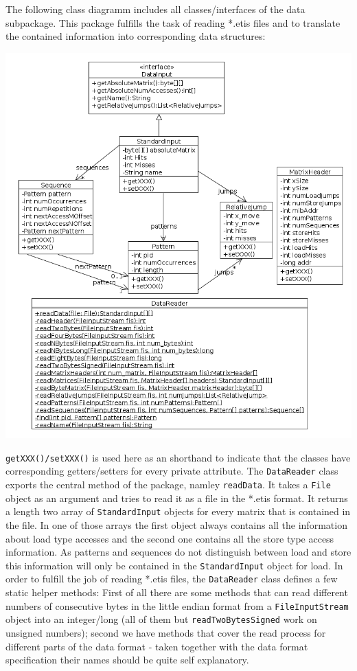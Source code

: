 The following class diagramm includes all classes/interfaces of the
data subpackage. This package fulfills the task of reading {*}.etis
files and to translate the contained information into corresponding
data structures:

\includegraphics[scale=0.55]{gui/DataClassDiagram.png}

\texttt{getXXX()/setXXX()} is used here as an shorthand to indicate
that the classes have corresponding getters/setters for every private
attribute. The \texttt{DataReader} class exports the central method
of the package, namley \texttt{readData}. It takes a \texttt{File}
object as an argument and tries to read it as a file in the {*}.etis
format. It returns a length two array of \texttt{StandardInput} objects
for every matrix that is contained in the file. In one of those arrays
the first object always contains all the information about load type
accesses and the second one contains all the store type access information.
As patterns and sequences do not distinguish between load and store
this information will only be contained in the \texttt{StandardInput}
object for load. In order to fulfill the job of reading {*}.etis files,
the \texttt{DataReader} class defines a few static helper methods:
First of all there are some methods that can read different numbers
of consecutive bytes in the little endian format from a \texttt{FileInputStream}
object into an integer/long (all of them but \texttt{readTwoBytesSigned}
work on unsigned numbers); second we have methods that cover the read
process for different parts of the data format - taken together with
the data format specification their names should be quite self explanatory.

